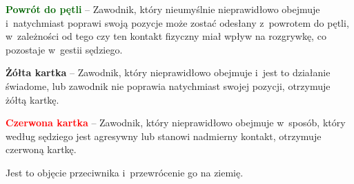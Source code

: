 \documentclass[12pt,a4paper]{article}
\renewcommand{\paragraph}[1]{
  \oldparagraph{#1}%
  \leftskip2.8cm
}
\newcommand\redcard[1]{\bgroup\textcolor{red}{\textbf{#1}}}
\newcommand\yellowcard[1]{\bgroup\textcolor{darkyellow}{\textbf{#1}}}
\newcommand\other[1]{\bgroup\textcolor{darkgreen}{\textbf{#1}}}
\begin{document}
\other{Powrót do pętli} -- Zawodnik, który nieumyślnie nieprawidłowo
obejmuje i~natychmiast poprawi swoją pozycje może zostać odesłany z~powrotem do pętli, w~zależności od tego czy ten kontakt fizyczny miał
wpływ na rozgrywkę, co pozostaje w~gestii sędziego.

\yellowcard{Żółta kartka} -- Zawodnik, który nieprawidłowo obejmuje i~jest to
działanie świadome, lub zawodnik nie poprawia natychmiast swojej
pozycji, otrzymuje żółtą kartkę.

\redcard{Czerwona kartka} -- Zawodnik, który nieprawidłowo obejmuje w~sposób, który według sędziego jest agresywny lub stanowi nadmierny
kontakt, otrzymuje czerwoną kartkę.

\paragraph{Przewracanie}
Jest to objęcie przeciwnika i~przewrócenie go na ziemię.
\end{document}
